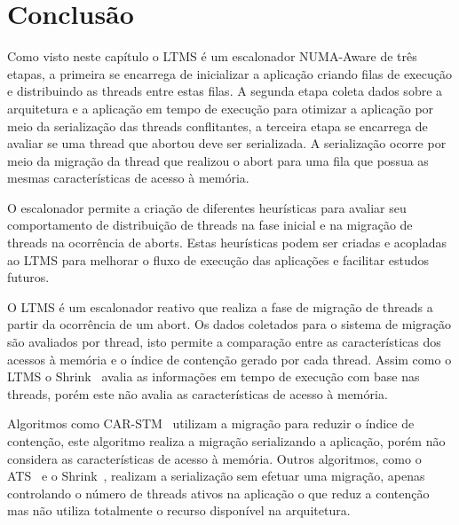 \documentclass[diss,capa]{texufpel}
\begin{document}
\section{Conclusão}

Como visto neste capítulo o LTMS é um escalonador NUMA-Aware de três etapas, a primeira se encarrega de inicializar a aplicação criando filas de execução e distribuindo as threads entre estas filas. A segunda etapa coleta dados sobre a arquitetura e a aplicação em tempo de execução para otimizar a aplicação por meio da serialização das threads conflitantes, a terceira etapa se encarrega de avaliar se uma thread que abortou deve ser serializada. A serialização ocorre por meio da migração da thread que realizou o abort para uma fila que possua as mesmas características de acesso à memória.

O escalonador permite a criação de diferentes heurísticas para avaliar seu comportamento de distribuição de threads na fase inicial e na migração de threads na ocorrência de aborts. Estas heurísticas podem ser criadas e acopladas ao LTMS para melhorar o fluxo de execução das aplicações e facilitar estudos futuros.

O LTMS é um escalonador reativo que realiza a fase de migração de threads a partir da ocorrência de um abort. Os dados coletados para o sistema de migração são avaliados por thread, isto permite a comparação entre as características dos acessos à memória e o índice de contenção gerado por cada thread. Assim como o LTMS o Shrink~\cite{shrink2009} avalia as informações em tempo de execução com base nas threads, porém este não avalia as características de acesso à memória.

Algoritmos como CAR-STM~\cite{carstm2008} utilizam a migração para reduzir o índice de contenção, este algoritmo realiza a migração serializando a aplicação, porém não considera as características de acesso à memória. Outros algoritmos, como o ATS~\cite{ats2008} e o Shrink~\cite{shrink2009}, realizam a serialização sem efetuar uma migração, apenas controlando o número de threads ativos na aplicação o que reduz a contenção mas não utiliza totalmente o recurso disponível na arquitetura.


\end{document}
